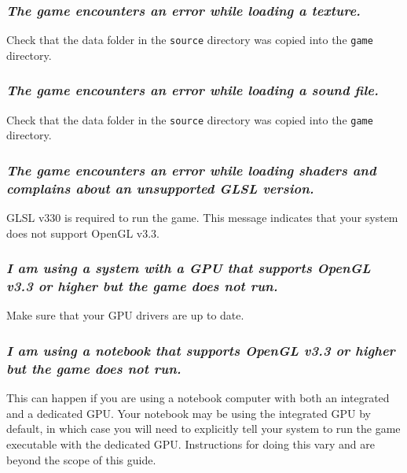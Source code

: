 \documentclass[12pt, titlepage]{article}
\begin{document}
\subsubsection{\emph{The game encounters an error while loading a texture.}}
\noindent Check that the data folder in the \texttt{source} directory was copied into the \texttt{game} directory.

\subsubsection{\emph{The game encounters an error while loading a sound file.}}
\noindent Check that the data folder in the \texttt{source} directory was copied into the \texttt{game} directory.

\subsubsection{\emph{The game encounters an error while loading shaders and complains about an unsupported GLSL version.}}
\noindent GLSL v330 is required to run the game.  This message indicates that your system does not support OpenGL v3.3.

\subsubsection{\emph{I am using a system with a GPU that supports OpenGL v3.3 or higher but the game does not run.}}
\noindent Make sure that your GPU drivers are up to date.

\subsubsection{\emph{I am using a notebook that supports OpenGL v3.3 or higher but the game does not run.}}
\noindent This can happen if you are using a notebook computer with both an integrated and a dedicated GPU.  Your notebook may be using the integrated GPU by default, in which case you will need to explicitly tell your system to run the game executable with the dedicated GPU.  Instructions for doing this vary and are beyond the scope of this guide.
\end{document}

